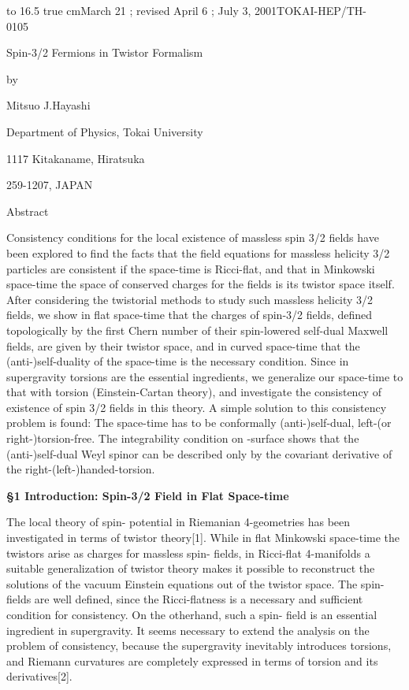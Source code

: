 \documentclass[a4paper,12pt]{article}
\begin{document}
\vskip 12pt
\hbox to 16.5 true cm{March 21 ; revised April 6 ; July 3, 2001\hfill TOKAI-HEP/TH-0105\ \ \ \ \ \ \ }
\vskip 32pt

\centerline{\Huge Spin-3/2 Fermions in Twistor Formalism}

\vskip 16pt
\centerline{\Large by}
\vskip 16pt
\centerline{\Large Mitsuo J.Hayashi}
\vskip 32pt
\centerline{\Large Department of Physics, Tokai University}
\centerline{\Large 1117 Kitakaname, Hiratsuka}
\centerline{\Large 259-1207, JAPAN}
\vskip 48pt

\centerline{\Large Abstract}
\vskip 16pt
 Consistency conditions for the local existence of massless spin 3/2 fields have been explored to find the facts that the field equations for massless helicity 3/2 particles are consistent if the space-time is Ricci-flat, and that in Minkowski space-time the space of conserved charges for the fields is its twistor space itself. After considering the twistorial methods to study such massless helicity 3/2 fields, we show in flat space-time that the charges of spin-3/2 fields, defined topologically by the first Chern number of their spin-lowered self-dual Maxwell fields, are given by their twistor space, and in curved space-time that the (anti-)self-duality of the space-time is the necessary condition. Since in \coordHE{} supergravity torsions are the essential ingredients, we generalize our space-time to that with torsion (Einstein-Cartan theory), and investigate the consistency of existence of spin 3/2 fields in this theory. A simple solution to this consistency problem is found: The space-time has to be conformally (anti-)self-dual, left-(or right-)torsion-free.  The integrability condition on \myHighlight{$\alpha$}\coordHE{}-surface shows that the (anti-)self-dual Weyl spinor can be described only by the covariant derivative of the right-(left-)handed-torsion.



\vfill

\eject

\vskip 16pt
{\bf \S 1 Introduction: Spin-3/2 Field in Flat Space-time}
\vskip 16pt

The local theory of spin-\coordHE{} potential in Riemanian 4-geometries has been investigated in terms of twistor theory[1].  While in flat Minkowski space-time the twistors arise as charges for massless spin-\coordHE{} fields, in Ricci-flat 4-manifolds a suitable generalization of twistor theory makes it possible to reconstruct the solutions of the vacuum Einstein equations out of the twistor space. The spin-\coordHE{} fields are well defined, since the Ricci-flatness is a necessary and sufficient condition for consistency.
On the otherhand, such a spin-\coordHE{} field is an essential ingredient in \coordHE{} supergravity. It seems necessary to extend the analysis on the problem of consistency, because the supergravity inevitably introduces torsions, and Riemann curvatures are completely expressed in terms of torsion and its derivatives[2].
\end{document}
